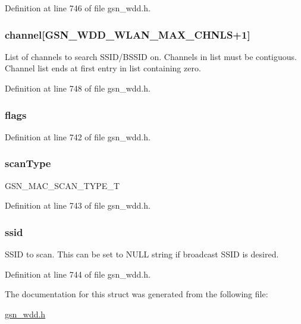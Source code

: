 Definition at line 746 of file gsn\_\-wdd.h.

\hypertarget{a00286_ad3776fa16ca5b00d270cd6365ac42a6f}{
\subsubsection[{channel}]{ {\bf channel}\mbox{[}GSN\_\-WDD\_\-WLAN\_\-MAX\_\-CHNLS+1\mbox{]}}}
\label{a00286_ad3776fa16ca5b00d270cd6365ac42a6f}
List of channels to search SSID/BSSID on. Channels in list must be contiguous. Channel list ends at first entry in list containing zero. 

Definition at line 748 of file gsn\_\-wdd.h.

\hypertarget{a00286_aff576da693a444e63d8375c2b7c71df6}{
\subsubsection[{flags}]{ {\bf flags}}}
\label{a00286_aff576da693a444e63d8375c2b7c71df6}


Definition at line 742 of file gsn\_\-wdd.h.

\hypertarget{a00286_a000a5568cb4c2c12ad873696b2d6f83e}{
\subsubsection[{scanType}]{ {\bf scanType}}}
\label{a00286_a000a5568cb4c2c12ad873696b2d6f83e}
GSN\_\-MAC\_\-SCAN\_\-TYPE\_\-T 

Definition at line 743 of file gsn\_\-wdd.h.

\hypertarget{a00286_a9bcb2e5a0dbdd5461faec24950cf7459}{
\subsubsection[{ssid}]{ {\bf ssid}}}
\label{a00286_a9bcb2e5a0dbdd5461faec24950cf7459}
SSID to scan. This can be set to NULL string if broadcast SSID is desired. 

Definition at line 744 of file gsn\_\-wdd.h.



The documentation for this struct was generated from the following file:\begin{DoxyCompactItemize}
\item 
\hyperlink{a00603}{gsn\_\-wdd.h}\end{DoxyCompactItemize}
